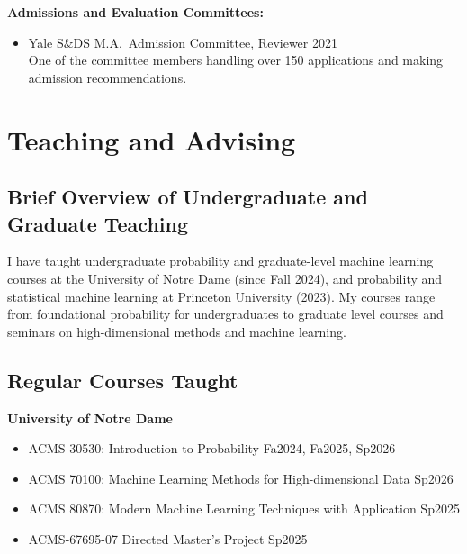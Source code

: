 \documentclass[11pt]{article}
\begin{document}
	\noindent\textbf{Admissions and Evaluation Committees:}
	\begin{itemize}[leftmargin=0pt, label={}]
		\item Yale S\&DS M.A.\ Admission Committee, Reviewer \hfill 2021\\
		One of the committee members handling over 150 applications and making admission recommendations.
	\end{itemize}
	
	
	\section*{Teaching and Advising}
	
	\subsection*{Brief Overview of Undergraduate and Graduate Teaching}
	
	\noindent I have taught undergraduate probability and graduate-level machine learning courses at the University of Notre Dame (since Fall 2024), and probability and statistical machine learning at Princeton University (2023). My courses range from foundational probability for undergraduates to graduate level courses and seminars on high-dimensional methods and machine learning.
	
	\subsection*{Regular Courses Taught}
	
	\noindent\textbf{University of Notre Dame}
	
	\begin{itemize}[leftmargin=0pt, label={}]
		\item ACMS 30530: Introduction to Probability \hfill Fa2024, Fa2025, Sp2026
		
		\item ACMS 70100: Machine Learning Methods for High-dimensional Data \hfill Sp2026
		
		\item ACMS 80870: Modern Machine Learning Techniques with Application \hfill Sp2025
		
		\item ACMS-67695-07 Directed Master's Project \hfill Sp2025
	\end{itemize}
	
\end{document}
